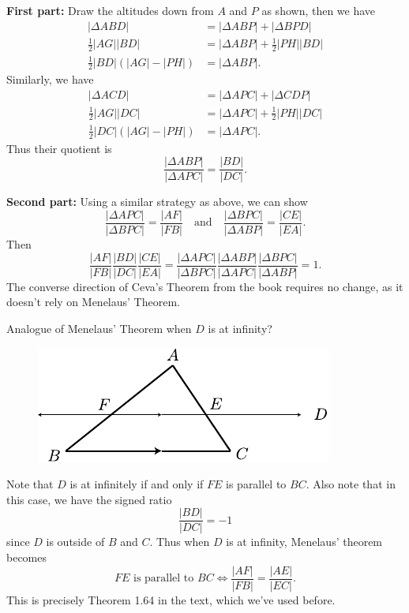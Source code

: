 \documentclass[twoside,10pt]{article}
\begin{document}
\textbf{First part:} Draw the altitudes down from $A$ and $P$ as shown, then we have
\begin{align*}
	|\Delta ABD| &= |\Delta ABP| + |\Delta BPD| \\
	\frac{1}{2} |AG| |BD| &= |\Delta ABP| + \frac{1}{2} |PH| |BD| \\
	\frac{1}{2} |BD| (|AG| - |PH|) &= |\Delta ABP|.
\end{align*}
Similarly, we have
\begin{align*}
	|\Delta ACD| &= |\Delta APC| + |\Delta CDP| \\
	\frac{1}{2} |AG| |DC| &= |\Delta APC| + \frac{1}{2} |PH| |DC| \\
	\frac{1}{2} |DC| (|AG|-|PH|) &= |\Delta APC|.
\end{align*}
Thus their quotient is
\[
\frac{|\Delta ABP|}{|\Delta APC|} = \frac{|BD|}{|DC|} .
\] 

\textbf{Second part:} Using a similar strategy as above, we can show
\[
	\frac{|\Delta APC|}{|\Delta BPC|} = \frac{|AF|}{|FB|} \quad\text{and}\quad \frac{|\Delta BPC|}{|\Delta ABP|} = \frac{|CE|}{|EA|} .
\] Then
\[
\frac{|AF|}{|FB|} \frac{|BD|}{|DC|} \frac{|CE|}{|EA|} = \frac{|\Delta APC|}{|\Delta BPC|} \frac{|\Delta ABP|}{|\Delta APC|} \frac{|\Delta BPC|}{|\Delta ABP|} = 1.
\] The converse direction of Ceva's Theorem from the book requires no change, as it doesn't rely on Menelaus' Theorem.

\newpage

\begin{exer}[1.166]
Analogue of Menelaus' Theorem when $D$ is at infinity?
\end{exer}

\begin{figure}[H]
	\centering
	\includegraphics[scale=1.5]{fig/166.pdf}
\end{figure}

Note that $D$ is at infinitely if and only if $FE$ is parallel to $BC$. Also note that in this case, we have the signed ratio
\[
	\frac{|BD|}{|DC|} =-1
\] since $D$ is outside of $B$ and $C$. Thus when $D$ is at infinity, Menelaus' theorem becomes
\[
	FE \text{ is parallel to } BC \iff  \frac{|AF|}{|FB|} = \frac{|AE|}{|EC|} .
\] This is precisely Theorem 1.64 in the text, which we've used before.
\end{document}
